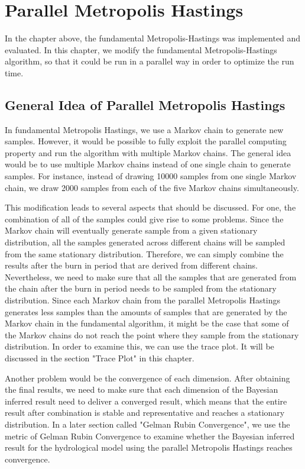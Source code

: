 \chapter{Parallel Metropolis Hastings}
In the chapter above, the fundamental Metropolis-Hastings was implemented and evaluated. In this chapter, we modify the fundamental Metropolis-Hastings algorithm, so that it could be run in a parallel way in order to optimize the run time.

\section{General Idea of Parallel Metropolis Hastings}
In fundamental Metropolis Hastings, we use a Markov chain to generate new samples. However, it would be possible to fully exploit the parallel computing property and run the algorithm with multiple Markov chains. The general idea would be to use multiple Markov chains instead of one single chain to generate samples. For instance, instead of drawing 10000 samples from one single Markov chain, we draw 2000 samples from each of the five Markov chains simultaneously. 

This modification leads to several aspects that should be discussed. For one, the combination of all of the samples could give rise to some problems. Since the Markov chain will eventually generate sample from a given stationary distribution, all the samples generated across different chains will be sampled from the same stationary distribution. Therefore, we can simply combine the results after the burn in period that are derived from different chains. Nevertheless, we need to make sure that all the samples that are generated from the chain after the burn in period needs to be sampled from the stationary distribution. Since each Markov chain from the parallel Metropolis Hastings generates less samples than the amounts of samples that are generated by the Markov chain in the fundamental algorithm, it might be the case that some of the Markov chains do not reach the point where they sample from the stationary distribution. In order to examine this, we can use the trace plot.\cite{mcmc_practice} It will be discussed in the section "Trace Plot" in this chapter.

Another problem would be the convergence of each dimension. After obtaining the final results, we need to make sure that each dimension of the Bayesian inferred result need to deliver a converged result, which means that the entire result after combination is stable and representative and reaches a stationary distribution. In a later section called "Gelman Rubin Convergence", we use the metric of Gelman Rubin Convergence to examine whether the Bayesian inferred result for the hydrological model using the parallel Metropolis Hastings reaches convergence.

